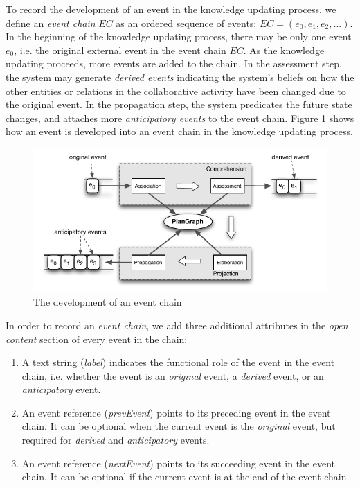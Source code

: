 To record the development of an event in the knowledge updating process, we define an \emph{event chain} $EC$ as an ordered sequence of events: $EC=(e_0, e_1, e_2, ...)$. In the beginning of the knowledge updating process, there may be only one event $e_0$, i.e. the original external event in the event chain $EC$. As the knowledge updating proceeds, more events are added to the chain. In the assessment step, the system may generate \emph{derived events} indicating the system's beliefs on how the other entities or relations in the collaborative activity have been changed due to the original event. In the propagation step, the system predicates the future state changes, and attaches more \emph{anticipatory events} to the event chain. Figure \ref{fig:knowledge_updating} shows how an event is developed into an event chain in the knowledge updating process.

\begin{figure}[htbp] %
	\centering
	\includegraphics{knowledge_updating.pdf} 
	\caption{The development of an event chain}
	\label{fig:knowledge_updating}
\end{figure}

In order to record an \emph{event chain}, we add three additional attributes in the \emph{open content} section of every event in the chain:

\begin{enumerate}
 	\item A text string (\emph{label}) indicates the functional role of the event in the event chain, i.e. whether the event is an \emph{original} event, a \emph{derived} event, or an \emph{anticipatory} event.
 	\item An event reference (\emph{prevEvent}) points to its preceding event in the event chain. It can be optional when the current event is the \emph{original} event, but required for \emph{derived} and \emph{anticipatory} events.
 	\item An event reference (\emph{nextEvent}) points to its succeeding event in the event chain. It can be optional if the current event is at the end of the event chain.
 \end{enumerate} 


